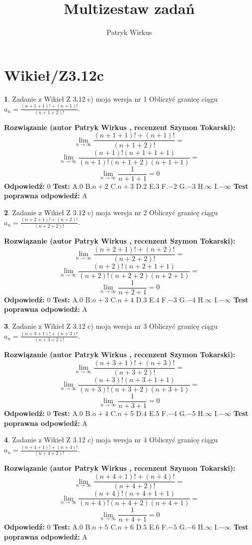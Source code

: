\documentclass[12pt, a4paper]{article}
\title{Multizestaw zadań}
\author{Patryk Wirkus}
\date{}
\theoremstyle{definition} %
\newtheorem{zad}{}
\newcommand{\kategoria}[1]{\section{#1}}
\newcommand{\zadStart}[1]{\begin{zad}#1\newline}
\newcommand{\zadStop}{\end{zad}}
\newcommand{\rozwStart}[2]{\noindent \textbf{Rozwiązanie (autor #1 , recenzent #2): }\newline}
\newcommand{\rozwStop}{\newline}
\newcommand{\odpStart}{\noindent \textbf{Odpowiedź:}\newline}
\newcommand{\odpStop}{\newline}
\newcommand{\testStart}{\noindent \textbf{Test:}\newline}
\newcommand{\testStop}{\newline}
\newcommand{\kluczStart}{\noindent \textbf{Test poprawna odpowiedź:}\newline}
\newcommand{\kluczStop}{\newline}
\begin{document}
\maketitle

\kategoria{Wikieł/Z3.12c}


\zadStart{Zadanie z Wikieł Z 3.12 c) moja wersja nr 1}
Obliczyć granicę ciągu $a_{n}=\frac{(n+1+1)!+(n+1)!}{(n+1+2)!}$.
\zadStop
\rozwStart{Patryk Wirkus}{Szymon Tokarski}
$$\lim\limits_{n\to\infty}\frac{(n+1+1)!+(n+1)!}{(n+1+2)!}=$$
$$\lim\limits_{n\to\infty}\frac{(n+1)!(n+1+1+1)}{(n+1)!(n+1+2)(n+1+1)}=$$
$$\lim\limits_{n\to\infty}\frac{1}{n+1+1}= 0$$
\rozwStop
\odpStart
$0$
\odpStop
\testStart
A.$0$
B.$n+2$
C.$n+3$
D.$2$
E.$3$
F.$-2$
G.$-3$
H.$\infty$
I.$-\infty$
\testStop
\kluczStart
A
\kluczStop



\zadStart{Zadanie z Wikieł Z 3.12 c) moja wersja nr 2}
Obliczyć granicę ciągu $a_{n}=\frac{(n+2+1)!+(n+2)!}{(n+2+2)!}$.
\zadStop
\rozwStart{Patryk Wirkus}{Szymon Tokarski}
$$\lim\limits_{n\to\infty}\frac{(n+2+1)!+(n+2)!}{(n+2+2)!}=$$
$$\lim\limits_{n\to\infty}\frac{(n+2)!(n+2+1+1)}{(n+2)!(n+2+2)(n+2+1)}=$$
$$\lim\limits_{n\to\infty}\frac{1}{n+2+1}= 0$$
\rozwStop
\odpStart
$0$
\odpStop
\testStart
A.$0$
B.$n+3$
C.$n+4$
D.$3$
E.$4$
F.$-3$
G.$-4$
H.$\infty$
I.$-\infty$
\testStop
\kluczStart
A
\kluczStop



\zadStart{Zadanie z Wikieł Z 3.12 c) moja wersja nr 3}
Obliczyć granicę ciągu $a_{n}=\frac{(n+3+1)!+(n+3)!}{(n+3+2)!}$.
\zadStop
\rozwStart{Patryk Wirkus}{Szymon Tokarski}
$$\lim\limits_{n\to\infty}\frac{(n+3+1)!+(n+3)!}{(n+3+2)!}=$$
$$\lim\limits_{n\to\infty}\frac{(n+3)!(n+3+1+1)}{(n+3)!(n+3+2)(n+3+1)}=$$
$$\lim\limits_{n\to\infty}\frac{1}{n+3+1}= 0$$
\rozwStop
\odpStart
$0$
\odpStop
\testStart
A.$0$
B.$n+4$
C.$n+5$
D.$4$
E.$5$
F.$-4$
G.$-5$
H.$\infty$
I.$-\infty$
\testStop
\kluczStart
A
\kluczStop



\zadStart{Zadanie z Wikieł Z 3.12 c) moja wersja nr 4}
Obliczyć granicę ciągu $a_{n}=\frac{(n+4+1)!+(n+4)!}{(n+4+2)!}$.
\zadStop
\rozwStart{Patryk Wirkus}{Szymon Tokarski}
$$\lim\limits_{n\to\infty}\frac{(n+4+1)!+(n+4)!}{(n+4+2)!}=$$
$$\lim\limits_{n\to\infty}\frac{(n+4)!(n+4+1+1)}{(n+4)!(n+4+2)(n+4+1)}=$$
$$\lim\limits_{n\to\infty}\frac{1}{n+4+1}= 0$$
\rozwStop
\odpStart
$0$
\odpStop
\testStart
A.$0$
B.$n+5$
C.$n+6$
D.$5$
E.$6$
F.$-5$
G.$-6$
H.$\infty$
I.$-\infty$
\testStop
\kluczStart
A
\kluczStop
\end{document}
